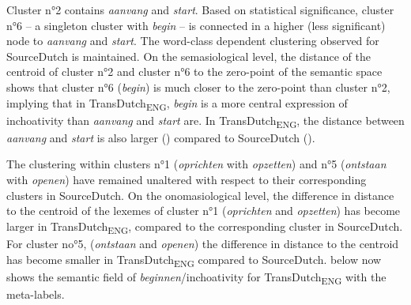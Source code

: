 Cluster n°2 contains \textit{aanvang} and \textit{start}. Based on statistical significance, cluster n°6 – a singleton cluster with \textit{begin} – is connected in a higher (less significant) node to \textit{aanvang} and \textit{start}. The word-class dependent clustering observed for SourceDutch is maintained. On the semasiological level, the distance of the centroid of cluster n°2 and cluster n°6 to the zero-point of the semantic space shows that cluster n°6 (\textit{begin}) is much closer to the zero-point than cluster n°2, implying that in TransDutch\textsubscript{ENG}, \textit{begin} is a more central expression of inchoativity than \textit{aanvang} and \textit{start} are. In TransDutch\textsubscript{ENG}, the distance between \textit{aanvang} and \textit{start} is also larger () compared to SourceDutch ().

The clustering within clusters n°1 (\textit{oprichten} with \textit{opzetten}) and n°5 (\textit{ontstaan} with \textit{openen}) have remained unaltered with respect to their corresponding clusters in SourceDutch. On the onomasiological level, the difference in distance to the centroid of the lexemes of cluster n°1 (\textit{oprichten} and \textit{opzetten}) has become larger in TransDutch\textsubscript{ENG}, compared to the corresponding cluster in SourceDutch. For cluster no°5, (\textit{ontstaan} and \textit{openen}) the difference in distance to the centroid has become smaller in TransDutch\textsubscript{ENG} compared to SourceDutch.  below now shows the semantic field of \textit{beginnen}/inchoativity for TransDutch\textsubscript{ENG} with the meta-labels.

